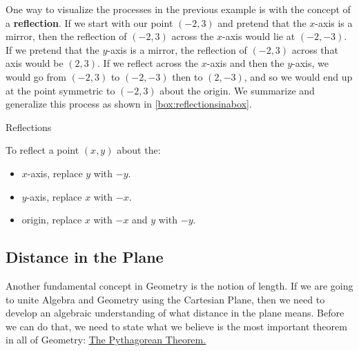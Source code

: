 One way to visualize the processes in the previous example is with the concept of a  \textbf{reflection}.  If we start with our point $(-2,3)$ and pretend that the $x$-axis is a mirror, then the reflection of $(-2,3)$ across the $x$-axis would lie at $(-2,-3)$.  If we pretend that the $y$-axis is a mirror, the reflection of $(-2,3)$ across that axis would be $(2,3)$.  If we reflect across the $x$-axis and then the $y$-axis, we would go from $(-2,3)$ to $(-2,-3)$ then to $(2,-3)$, and so we would end up at the point symmetric to $(-2,3)$ about the origin.  We summarize and generalize this process as shown in \autoref{box:reflectionsinabox}.

\begin{floatbox}{Reflections}
\label{box:reflectionsinabox}

To reflect a point $(x,y)$ about the:

\begin{itemize}

\item  $x$-axis, replace $y$ with $-y$.

\item  $y$-axis, replace $x$ with $-x$.

\item  origin, replace $x$ with $-x$ and $y$ with $-y$.

\end{itemize}

\end{floatbox}


\subsection{Distance in the Plane}
\label{Distance}

Another fundamental concept in Geometry is the notion of length.  If we are going to unite Algebra and Geometry using the Cartesian Plane, then we need to develop an algebraic understanding of what distance in the plane means.  Before we can do that, we need to state what we believe is the most important theorem in all of Geometry: \href{http://en.wikipedia.org/wiki/Pythagorean_Theorem}{\underline{The Pythagorean Theorem.}}


